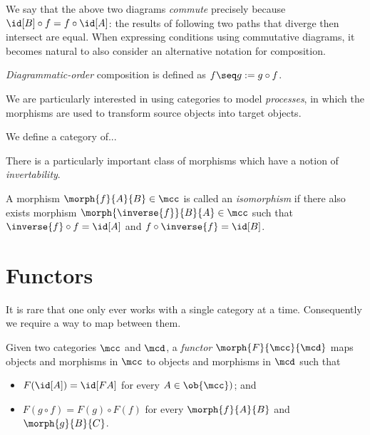 We say that the above two diagrams \emph{commute} precisely because \(
    \id[B] \circ f = f \circ \id[A]
\): the results of following two paths that diverge then intersect are equal.
When expressing conditions using commutative diagrams, it becomes natural to
also consider an alternative notation for composition.

\begin{notation}
    \emph{Diagrammatic-order} composition is defined as
    \(f \seq g := g \circ f\).
\end{notation}

We are particularly interested in using categories to model \emph{processes},
in which the morphisms are used to transform source objects into target objects.

\begin{example}
    We define a category of...
\end{example}

There is a particularly important class of morphisms which have a notion of
\emph{invertability}.

\begin{definition}[Isomorphism]
    A morphism \(\morph{f}{A}{B} \in \mcc\) is called an \emph{isomorphism} if
    there also exists morphism \(\morph{\inverse{f}}{B}{A} \in \mcc\) such
    that \(\inverse{f} \circ f = \id[A]\) and \(f \circ \inverse{f} = \id[B]\).
\end{definition}

\section{Functors}

It is rare that one only ever works with a single category at a time.
Consequently we require a way to map between them.

\begin{definition}[Functor]
    Given two categories \(\mcc\) and \(\mcd\), a \emph{functor} \(
        \morph{F}{\mcc}{\mcd}
    \) maps objects and morphisms in \(\mcc\) to objects and morphisms in
    \(\mcd\) such that
    \begin{itemize}
        \item \(F(\id[A]) = \id[FA]\) for every \(A \in \ob{\mcc})\); and
        \item \(F(g \circ f) = F(g) \circ F(f)\) for every \(\morph{f}{A}{B}\)
        and \(\morph{g}{B}{C}\).
    \end{itemize}
\end{definition}

